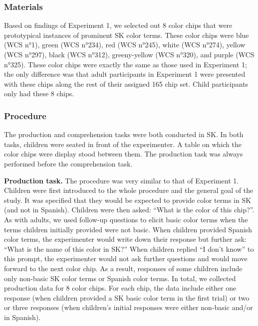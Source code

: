 \documentclass[
  english,
  ,man,floatsintext]{apa6}
\begin{document}
\hypertarget{materials-1}{%
\subsubsection{Materials}\label{materials-1}}

Based on findings of Experiment 1, we selected out 8 color chips that were prototypical instances of prominent SK color terms. These color chips were blue (WCS n°1), green (WCS n°234), red (WCS n°245), white (WCS n°274), yellow (WCS n°297), black (WCS n°312), greeny-yellow (WCS n°320), and purple (WCS n°325). These color chips were exactly the same as those used in Experiment 1; the only difference was that adult participants in Experiment 1 were presented with these chips along the rest of their assigned 165 chip set. Child participants only had these 8 chips.

\hypertarget{procedure-1}{%
\subsubsection{Procedure}\label{procedure-1}}

The production and comprehension tasks were both conducted in SK. In both tasks, children were seated in front of the experimenter. A table on which the color chips were display stood between them. The production task was always performed before the comprehension task.

\textbf{Production task.} The procedure was very similar to that of Experiment 1. Children were first introduced to the whole procedure and the general goal of the study. It was specified that they would be expected to provide color terms in SK (and not in Spanish). Children were then asked: \enquote{What is the color of this chip?}. As with adults, we used follow-up questions to elicit basic color terms when the terms children initially provided were not basic. When children provided Spanish color terms, the experimenter would write down their response but further ask: \enquote{What is the name of this color in SK?} When children replied \enquote{I don't know} to this prompt, the experimenter would not ask further questions and would move forward to the next color chip. As a result, responses of some children include only non-basic SK color terms or Spanish color terms. In total, we collected production data for 8 color chips. For each chip, the data include either one response (when children provided a SK basic color term in the first trial) or two or three responses (when children's initial responses were either non-basic and/or in Spanish).
\end{document}
